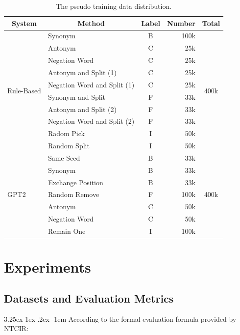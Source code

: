 \documentclass[12pt]{article}
\makeatletter
\renewcommand\paragraph{\@startsection{paragraph}{5}{\z@}%
  {3.25ex \@plus1ex \@minus.2ex}%
  {-1em}%
  {\normalfont\normalsize\bfseries}}
\makeatother
\begin{document}
\begin{CJK*}{UTF8}{bkai}
\begin{spacing}{1.77}
\begin{table}[H]
  \centering
  \setlength{\extrarowheight}{-3pt}
  \begin{tabular}{|l|l|c|r|c|}
  \hline
  \multicolumn{1}{|c|}{System} & \multicolumn{1}{c|}{Method} & Label & \multicolumn{1}{c|}{Number} & Total \\ \hline
  \multirow{10}{*}{Rule-Based} & Synonym & B & 100k & \multirow{10}{*}{400k} \\ \cline{2-4}
   & Antonym & C & 25k &  \\ \cline{2-4}
   & Negation Word & C & 25k &  \\ \cline{2-4}
   & Antonym and Split (1) & C & 25k &  \\ \cline{2-4}
   & Negation Word and Split (1) & C & 25k &  \\ \cline{2-4}
   & Synonym and Split & F & 33k &  \\ \cline{2-4}
   & Antonym and Split (2) & F & 33k &  \\ \cline{2-4}
   & Negation Word and Split (2) & F & 33k &  \\ \cline{2-4}
   & Radom Pick & I & 50k &  \\ \cline{2-4}
   & Random Split & I & 50k &  \\ \hline
  \multirow{7}{*}{GPT2} & Same Seed & B & 33k & \multirow{7}{*}{400k} \\ \cline{2-4}
   & Synonym & B & 33k &  \\ \cline{2-4}
   & Exchange Position & B & 33k &  \\ \cline{2-4}
   & Random Remove & F & 100k &  \\ \cline{2-4}
   & Antonym & C & 50k &  \\ \cline{2-4}
   & Negation Word & C & 50k &  \\ \cline{2-4}
   & Remain One & I & 100k &  \\ \hline
  \end{tabular}
  \caption{The pseudo training data distribution.}
  \label{table:pseudo_training_data_dist}
\end{table}

\section{Experiments} \label{section:experiments}
\subsection{Datasets and Evaluation Metrics}
\paragraph{}
According to the formal evaluation formula provided by NTCIR:


\end{spacing}
\end{CJK*}
\end{document}
